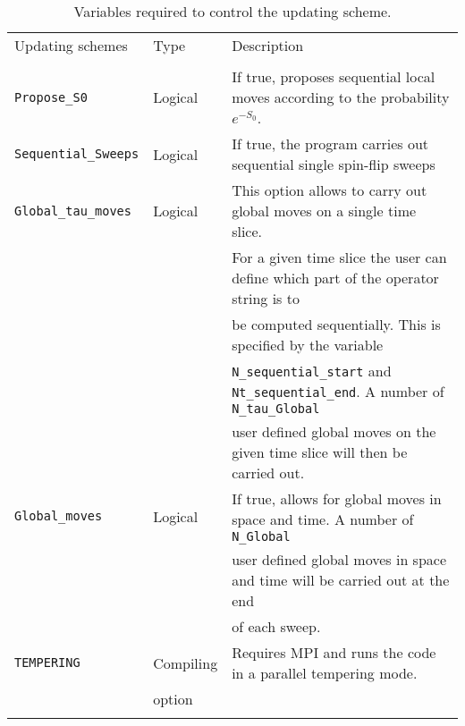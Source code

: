\begin{table}[h]
   \begin{tabular}{@{} l l l @{}}\toprule
        Updating schemes &  Type                  &  Description   \\
         \\\midrule
         \texttt{Propose\_S0}                &   Logical     &  If true, proposes sequential local moves according to the probability $e^{-S_0}$. \\
         \texttt{Sequential\_Sweeps}    &   Logical     &  If true,  the program carries out sequential single spin-flip sweeps  \\ 
         \texttt{Global\_tau\_moves}     &   Logical     &  This option allows to carry out  global moves on a single time slice.  \\
                                                         &                   &  For a given time slice the user can define which part of the operator string is to  \\
	                                                &                    &  be computed sequentially. This is specified by the  variable  \\
	                                                &                    &  \texttt{N\_sequential\_start}  and \texttt{Nt\_sequential\_end}. A number of   \texttt{N\_tau\_Global}\\
	                                                &                    &  user defined global moves on the given time slice  will then be carried out.   \\
        \texttt{Global\_moves} &  Logical        &   If true, allows for global moves in space and time.   A number of  \texttt{N\_Global }    \\ 
        			                   &                      & user defined global moves in space and time  will be carried out at the end  \\ 
			                   &                      & of each sweep. \\
         \texttt{TEMPERING}   &  Compiling  &    Requires MPI and  runs the code in a parallel tempering mode.  \\
         & option & \\
         \\\bottomrule
   \end{tabular}
   \caption{Variables required to control the updating scheme. \label{table:Updating_schemes}}
\end{table}
% 
